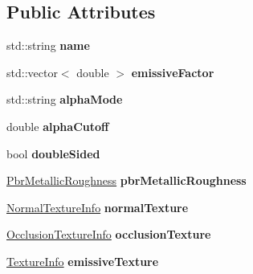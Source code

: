 \subsection*{Public Attributes}
\begin{DoxyCompactItemize}
\item 
\mbox{\label{structtinygltf_1_1Material_a1ec418a3c2f82636ece24b57ad1dd183}} 
std\+::string {\bfseries name}
\item 
\mbox{\label{structtinygltf_1_1Material_af7537b32f260b01fc017f7021e83b069}} 
std\+::vector$<$ double $>$ {\bfseries emissive\+Factor}
\item 
\mbox{\label{structtinygltf_1_1Material_aec12493b8c3950c38c69de8a9976d75a}} 
std\+::string {\bfseries alpha\+Mode}
\item 
\mbox{\label{structtinygltf_1_1Material_a3aec03391a6e4a5fb4a416c5b75e81c3}} 
double {\bfseries alpha\+Cutoff}
\item 
\mbox{\label{structtinygltf_1_1Material_a8bf26e3f6dfdd8012b6d75d25371ec1d}} 
bool {\bfseries double\+Sided}
\item 
\mbox{\label{structtinygltf_1_1Material_ad771074fe40bbcfcdddc5a1b42c11771}} 
\hyperlink{structtinygltf_1_1PbrMetallicRoughness}{Pbr\+Metallic\+Roughness} {\bfseries pbr\+Metallic\+Roughness}
\item 
\mbox{\label{structtinygltf_1_1Material_aa1429d4eda3c2ce2143420f284c825d7}} 
\hyperlink{structtinygltf_1_1NormalTextureInfo}{Normal\+Texture\+Info} {\bfseries normal\+Texture}
\item 
\mbox{\label{structtinygltf_1_1Material_aff7562263f6527fbbb00a363e2db8b36}} 
\hyperlink{structtinygltf_1_1OcclusionTextureInfo}{Occlusion\+Texture\+Info} {\bfseries occlusion\+Texture}
\item 
\mbox{\label{structtinygltf_1_1Material_af00d38cc578f1979064ef3b8d314b414}} 
\hyperlink{structtinygltf_1_1TextureInfo}{Texture\+Info} {\bfseries emissive\+Texture}

\end{DoxyCompactItemize}
